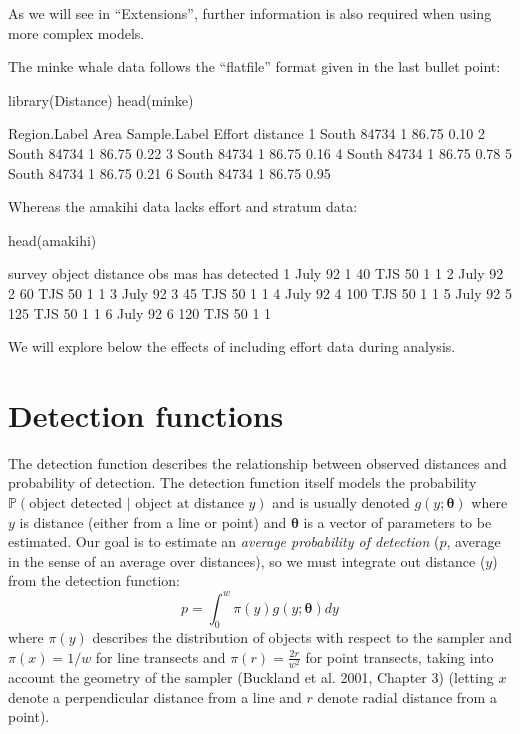 \documentclass[article]{jss}
\begin{document}
As we will see in ``Extensions'', further information is also required
when using more complex models.

The minke whale data follows the ``flatfile'' format given in the last
bullet point:

\begin{CodeChunk}
\begin{CodeInput}
library(Distance)
head(minke)
\end{CodeInput}
\begin{CodeOutput}
  Region.Label  Area Sample.Label Effort distance
1        South 84734            1  86.75     0.10
2        South 84734            1  86.75     0.22
3        South 84734            1  86.75     0.16
4        South 84734            1  86.75     0.78
5        South 84734            1  86.75     0.21
6        South 84734            1  86.75     0.95
\end{CodeOutput}
\end{CodeChunk}

Whereas the amakihi data lacks effort and stratum data:

\begin{CodeChunk}
\begin{CodeInput}
head(amakihi)
\end{CodeInput}
\begin{CodeOutput}
   survey object distance obs mas has detected
1 July 92      1       40 TJS  50   1        1
2 July 92      2       60 TJS  50   1        1
3 July 92      3       45 TJS  50   1        1
4 July 92      4      100 TJS  50   1        1
5 July 92      5      125 TJS  50   1        1
6 July 92      6      120 TJS  50   1        1
\end{CodeOutput}
\end{CodeChunk}

We will explore below the effects of including effort data during
analysis.

\section{Detection functions}\label{detection-functions}

The detection function describes the relationship between observed
distances and probability of detection. The detection function itself
models the probability
\(\mathbb{P}(\text{object detected } \vert \text{ object at distance } y)\)
and is usually denoted \(g(y; \boldsymbol{\theta})\) where \(y\) is
distance (either from a line or point) and \(\boldsymbol{\theta}\) is a
vector of parameters to be estimated. Our goal is to estimate an
\emph{average probability of detection} (\(p\), average in the sense of
an average over distances), so we must integrate out distance (\(y\))
from the detection function: \[
p = \int_0^w \pi(y) g(y; \boldsymbol{\theta}) dy
\] where \(\pi(y)\) describes the distribution of objects with respect
to the sampler and \(\pi(x)=1/w\) for line transects and
\(\pi(r)=\frac{2r}{w^2}\) for point transects, taking into account the
geometry of the sampler (Buckland et al. 2001, Chapter 3) (letting \(x\)
denote a perpendicular distance from a line and \(r\) denote radial
distance from a point).
\end{document}
